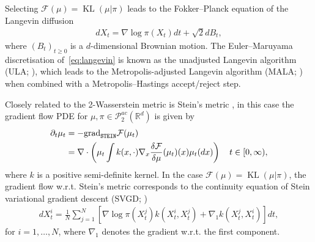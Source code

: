 \documentclass{article}
\newcommand{\KL}{\mathop{\mathrm{KL}}\nolimits}
\newcommand{\cF}{\mathcal F}
\newcommand{\R}{\mathbb R}
\newcommand{\grad}{\textrm {grad}}
\begin{document}
Selecting $\cF(\mu)=\KL(\mu|\pi)$ leads to the Fokker--Planck equation of the Langevin diffusion \citep{jordan1998variational}
\begin{align}
\label{eq:langevin}
    dX_t = \nabla\log\pi(X_t)dt + \sqrt{2}dB_t,
\end{align}
where $(B_t)_{t\geq 0}$ is a $d$-dimensional Brownian motion.
The Euler--Maruyama discretisation of~\eqref{eq:langevin} is known as the unadjusted Langevin algorithm (ULA; \cite{durmus2019analysis}), which leads to the Metropolis-adjusted Langevin algorithm (MALA; \cite{roberts1996exponential}) when combined with a Metropolis--Hastings accept/reject step.


Closely related to the 2-Wasserstein metric is Stein's metric \citep{duncan2023geometry}, in this case the gradient flow PDE for $\mu, \pi\in \mathcal{P}_2^{ac}(\R^d)$ is given by
\begin{align}
    \partial_t \mu_t&=  -\grad_{\mathtt{STEIN}}\cF(\mu_t)\\
    &= \nabla \cdot \left( \mu_t\int k(x, \cdot)\nabla_x \frac{\delta \cF}{\delta \mu}(\mu_t)( x)\mu_t(dx) \right)  \quad t \in [0,\infty),\notag
\end{align}
where $k$ is a positive semi-definite kernel. In the case $\cF(\mu)=\KL(\mu|\pi)$, the gradient flow w.r.t. Stein's metric corresponds to the continuity equation of Stein variational gradient descent (SVGD; \cite{liu2017stein})
\begin{align}
\label{eq:svgd}
    dX_t^i = \frac{1}{N}\sum_{j=1}^N [\nabla\log\pi(X_t^j)k(X_t^i, X_t^j)+\nabla_1 k(X_t^j, X_t^i)]dt,
\end{align}
for $i=1, \dots, N$, where $\nabla_1$ denotes the gradient w.r.t. the first component.
\end{document}

